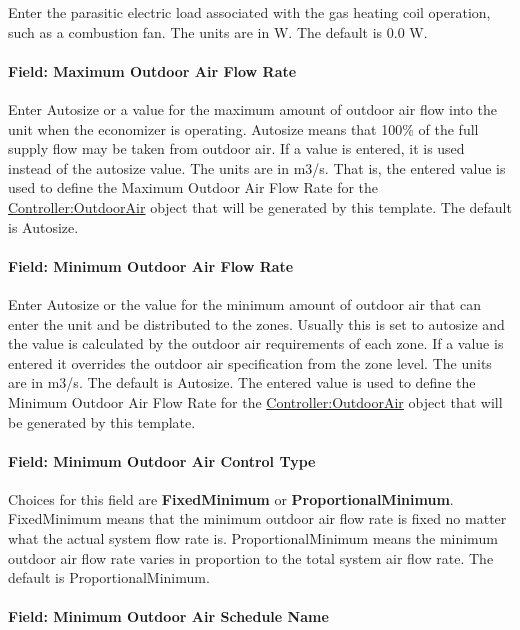 Enter the parasitic electric load associated with the gas heating coil operation, such as a combustion fan. The units are in W. The default is 0.0 W.

\paragraph{Field: Maximum Outdoor Air Flow Rate}\label{field-maximum-outdoor-air-flow-rate-4}

Enter Autosize or a value for the maximum amount of outdoor air flow into the unit when the economizer is operating. Autosize means that 100\% of the full supply flow may be taken from outdoor air. If a value is entered, it is used instead of the autosize value. The units are in m3/s. That is, the entered value is used to define the Maximum Outdoor Air Flow Rate for the \hyperref[controlleroutdoorair]{Controller:OutdoorAir} object that will be generated by this template. The default is Autosize.

\paragraph{Field: Minimum Outdoor Air Flow Rate}\label{field-minimum-outdoor-air-flow-rate-4}

Enter Autosize or the value for the minimum amount of outdoor air that can enter the unit and be distributed to the zones. Usually this is set to autosize and the value is calculated by the outdoor air requirements of each zone. If a value is entered it overrides the outdoor air specification from the zone level. The units are in m3/s. The default is Autosize. The entered value is used to define the Minimum Outdoor Air Flow Rate for the \hyperref[controlleroutdoorair]{Controller:OutdoorAir} object that will be generated by this template.

\paragraph{Field: Minimum Outdoor Air Control Type}\label{field-minimum-outdoor-air-control-type-1}

Choices for this field are \textbf{FixedMinimum} or \textbf{ProportionalMinimum}. FixedMinimum means that the minimum outdoor air flow rate is fixed no matter what the actual system flow rate is. ProportionalMinimum means the minimum outdoor air flow rate varies in proportion to the total system air flow rate. The default is ProportionalMinimum.

\paragraph{Field: Minimum Outdoor Air Schedule Name}\label{field-minimum-outdoor-air-schedule-name-3}

